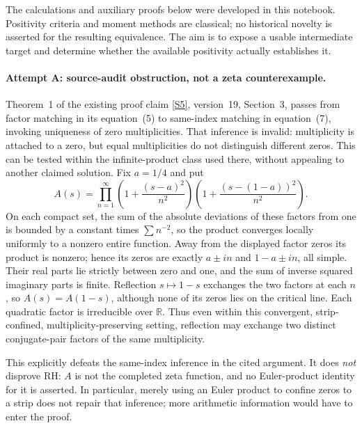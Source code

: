 \documentclass[11pt]{article}
\newcommand{\R}{\mathbb{R}}
\newcommand{\sref}[2]{\hyperlink{source:#1:#2}{[S#2]}}
\begin{document}
The calculations and auxiliary proofs below were developed in this notebook.
Positivity criteria and moment methods are classical; no historical novelty
is asserted for the resulting equivalence. The aim is to expose a usable
intermediate target and determine whether the available positivity actually
establishes it.

\paragraph{Attempt A: source-audit obstruction, not a zeta counterexample.}
Theorem~1 of the existing proof claim \sref{2}{5}, version~19,
Section~3, passes from factor matching in its equation~(5) to same-index
matching in equation~(7), invoking uniqueness of zero multiplicities. That
inference is invalid: multiplicity is attached to a zero, but equal
multiplicities do not distinguish different zeros. This can be tested within
the infinite-product class used there, without appealing to another claimed
solution. Fix $a=1/4$ and put
\begin{equation}\label{ra:2:symmetry-test}
 A(s)=\prod_{n=1}^{\infty}
 \left(1+\frac{(s-a)^2}{n^2}\right)
 \left(1+\frac{(s-(1-a))^2}{n^2}\right).
\end{equation}
On each compact set, the sum of the absolute deviations of these factors from
one is bounded by a constant times $\sum n^{-2}$, so the product converges
locally uniformly to a nonzero entire function. Away from the displayed
factor zeros its product is nonzero; hence its zeros are exactly
$a\pm in$ and $1-a\pm in$, all simple. Their real parts lie strictly between
zero and one, and the sum of inverse squared imaginary parts is finite.
Reflection $s\mapsto1-s$ exchanges the two factors at each $n$, so
$A(s)=A(1-s)$, although none of its zeros lies on the critical line.
Each quadratic factor is irreducible over $\R$. Thus even within this
convergent, strip-confined, multiplicity-preserving setting, reflection may
exchange two distinct conjugate-pair factors of the same multiplicity.

This explicitly defeats the same-index inference in the cited argument.
It does \emph{not} disprove RH: $A$ is not the completed zeta function, and no
Euler-product identity for it is asserted. In particular, merely using an
Euler product to confine zeros to a strip does not repair that inference;
more arithmetic information would have to enter the proof.
\end{document}
